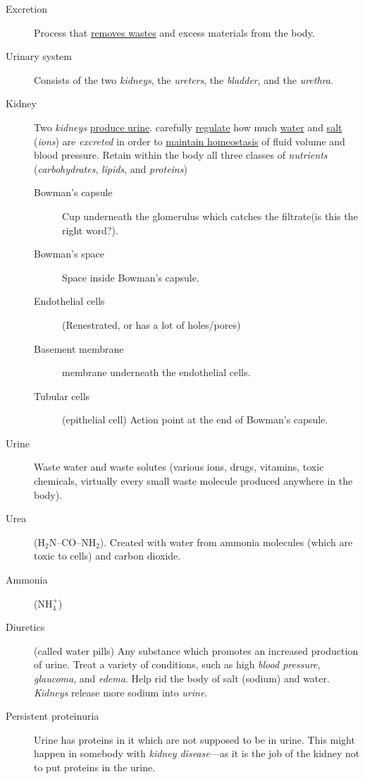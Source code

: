 \documentclass[11pt]{article}
\begin{document}
\begin{description}
\item[{Excretion}] Process that \uline{removes wastes} and excess materials from the body.
\item[{Urinary system}] Consists of the two \emph{kidneys}, the \emph{ureters}, the \emph{bladder}, and
the \emph{urethra}.
\item[{Kidney}] Two \emph{kidneys} \uline{produce urine}. carefully \uline{regulate} how much \uline{water} and
\uline{salt} (\emph{ions}) are \emph{excreted} in order to \uline{maintain homeostasis} of fluid volume
and blood pressure. Retain within the body all three classes of \emph{nutrients}
(\emph{carbohydrates}, \emph{lipids}, and \emph{proteins})
\begin{description}
\item[{Bowman's capsule}] Cup underneath the glomerulus which catches the
filtrate(is this the right word?).
\item[{Bowman's space}] Space inside Bowman's capsule.
\item[{Endothelial cells}] (Renestrated, or has a lot of holes/pores)
\item[{Basement membrane}] membrane underneath the endothelial cells.
\item[{Tubular cells}] (epithelial cell) Action point at the end of Bowman's
capsule.
\end{description}
\item[{Urine}] Waste water and waste solutes (various ions, drugs, vitamins, toxic
chemicals, virtually every small waste molecule produced anywhere in the
body).
\item[{Urea}] (H\(_{\text{2}}\)N--CO--NH\(_{\text{2}}\)). Created with water from ammonia molecules (which are
toxic to cells) and carbon dioxide.
\item[{Ammonia}] (NH\(_{\text{4}}^{\text{+}}\))
\item[{Diuretics}] (called water pills) Any substance which promotes an increased
production of urine. Treat a variety of conditions, such as high \emph{blood
pressure}, \emph{glaucoma}, and \emph{edema}. Help rid the body of salt (sodium) and
water. \emph{Kidneys} release more sodium into \emph{urine}.
\item[{Persistent proteinuria}] Urine has proteins in it which are not supposed to
be in urine. This might happen in somebody with \emph{kidney disease}---as it is
the job of the kidney not to put proteins in the urine.
\end{description}
\end{document}
